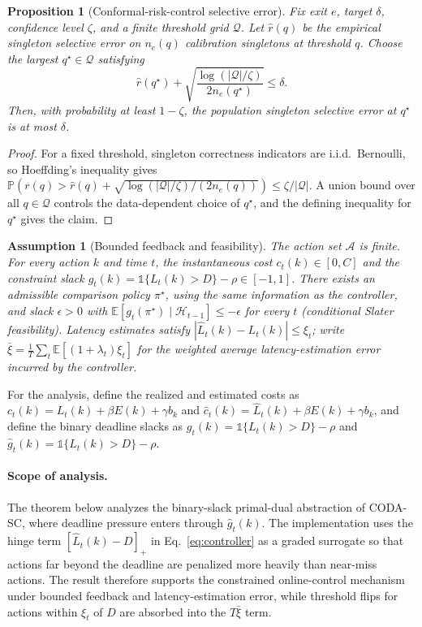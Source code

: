 \documentclass[11pt]{article}
\newtheorem{proposition}{Proposition}
\newtheorem{assumption}{Assumption}
\begin{document}
\begin{proposition}[Conformal-risk-control selective error]
\label{prop:crc}
Fix exit $e$, target $\delta$, confidence level $\zeta$, and a finite threshold
grid $\mathcal{Q}$. Let $\widehat{r}(q)$ be the empirical singleton selective
error on $n_e(q)$ calibration singletons at threshold $q$. Choose the largest
$q^{\star}\in\mathcal{Q}$ satisfying
\begin{equation}
    \widehat{r}(q^{\star})+
    \sqrt{\frac{\log(|\mathcal{Q}|/\zeta)}{2n_e(q^{\star})}}\le\delta .
\end{equation}
Then, with probability at least $1-\zeta$, the population singleton selective
error at $q^{\star}$ is at most $\delta$.
\end{proposition}
\begin{proof}
For a fixed threshold, singleton correctness indicators are i.i.d.\ Bernoulli, so
Hoeffding's inequality gives
$\mathbb{P}(r(q)>\widehat{r}(q)+\sqrt{\log(|\mathcal{Q}|/\zeta)/(2n_e(q))})\le
\zeta/|\mathcal{Q}|$. A union bound over all $q\in\mathcal{Q}$ controls the
data-dependent choice of $q^{\star}$, and the defining inequality for
$q^{\star}$ gives the claim.
\end{proof}

\begin{assumption}[Bounded feedback and feasibility]
\label{ass:bounded}
The action set $\mathcal{A}$ is finite. For every action $k$ and time $t$, the
instantaneous cost $c_t(k)\in[0,C]$ and the constraint slack
$g_t(k)=\mathbb{1}\{L_t(k)>D\}-\rho\in[-1,1]$. There exists an admissible
comparison policy $\pi^{\star}$, using the same information as the controller, and slack
$\epsilon>0$ with
$\mathbb{E}[g_t(\pi^{\star})\mid\mathcal{H}_{t-1}]\le-\epsilon$ for every $t$
(conditional Slater feasibility). Latency estimates satisfy
$|\widehat{L}_t(k)-L_t(k)|\le\xi_t$; write
$\bar\xi=\frac1T\sum_t\mathbb{E}[(1+\lambda_t)\xi_t]$ for the weighted average
latency-estimation error incurred by the controller.
\end{assumption}

For the analysis, define the realized and estimated costs as
$c_t(k)=L_t(k)+\beta E(k)+\gamma b_k$ and
$\widehat{c}_t(k)=\widehat{L}_t(k)+\beta E(k)+\gamma b_k$, and define the binary
deadline slacks as
$g_t(k)=\mathbb{1}\{L_t(k)>D\}-\rho$ and
$\widehat{g}_t(k)=\mathbb{1}\{\widehat{L}_t(k)>D\}-\rho$.

\paragraph{Scope of analysis.}
The theorem below analyzes the binary-slack primal-dual abstraction of CODA-SC,
where deadline pressure enters through $\widehat{g}_t(k)$. The implementation
uses the hinge term $[\widehat{L}_t(k)-D]_+$ in Eq.~\eqref{eq:controller} as a
graded surrogate so that actions far beyond the deadline are penalized more
heavily than near-miss actions. The result therefore supports the constrained
online-control mechanism under bounded feedback and latency-estimation error,
while threshold flips for actions within $\xi_t$ of $D$ are absorbed into the
$T\bar\xi$ term.
\end{document}
